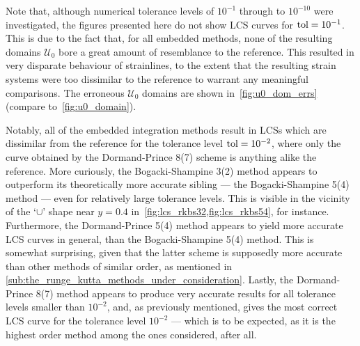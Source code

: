 Note that, although numerical tolerance levels of $10^{-1}$ through to
$10^{-10}$ were investigated, the figures presented here do not show LCS curves
for $\textnormal{tol}=10^{-1}$. This is due to the fact that, for all
embedded methods, none of the resulting domains $\mathcal{U}_{0}$ bore
a great amount of resemblance to the reference. This resulted in very disparate
behaviour of strainlines, to the extent that the resulting strain systems were
too dissimilar to the reference to warrant any meaningful comparisons. The
erroneous $\mathcal{U}_{0}$ domains are shown in~\cref{fig:u0_dom_errs}
(compare to~\cref{fig:u0_domain}).

Notably, all of the embedded integration methods result in LCSs which are
dissimilar from the reference for the tolerance level $\textnormal{tol}=10^{-2}$,
where only the curve obtained by the Dormand-Prince 8(7) scheme is anything
alike the reference. More curiously, the Bogacki-Shampine 3(2) method appears
to outperform its theoretically more accurate sibling --- the
Bogacki-Shampine 5(4) method --- even for relatively
large tolerance levels. This is visible in the
vicinity of the `$\cup$' shape near $y=0.4$ in~\cref{fig:lcs_rkbs32,fig:lcs_rkbs54},
for instance. Furthermore, the Dormand-Prince 5(4) method appears to yield more
accurate LCS curves in general, than the Bogacki-Shampine 5(4) method. This
is somewhat surprising, given that the latter scheme is supposedly more accurate
than other methods of similar order, as mentioned in
\cref{sub:the_runge_kutta_methods_under_consideration}. Lastly, the
Dormand-Prince 8(7) method appears to produce very accurate results for all
tolerance levels smaller than $10^{-2}$, and, as previously mentioned, gives
the most correct LCS curve for the tolerance level $10^{-2}$
--- which is to be expected, as it is the highest order method among the ones
considered, after all.
\vspace{\fill}










